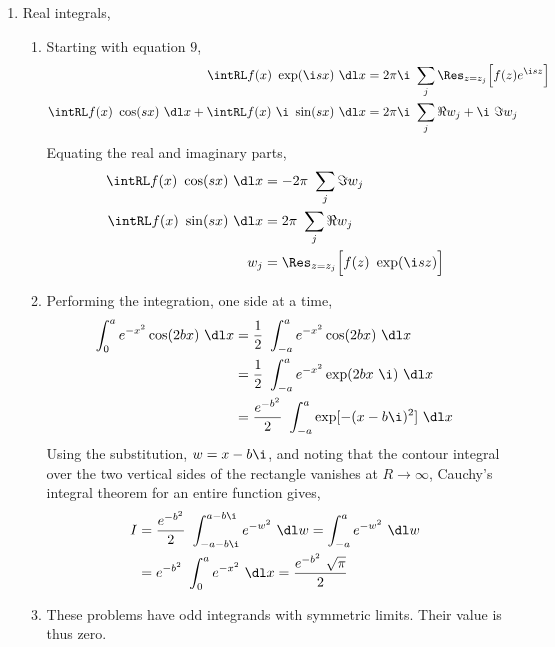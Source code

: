 \begin{enumerate}
    \item Real integrals,
          \begin{enumerate}
              \item Starting with equation $ 9 $,
                    \begin{align}
                        \intRL f(x)\ \exp(\i sx)\ \dl x  & = 2\pi\i
                        \ \sum_j \Res_{z = z_j}
                        \Big[f(z) e^{\i sz} \Big]                   \\
                        \intRL f(x)\ \cos(sx)\ \dl x +
                        \intRL f(x)\ \i\ \sin(sx)\ \dl x & =
                        2\pi\i\ \sum_j \Re{w_j} + \i\ \Im{w_j}
                    \end{align}
                    Equating the real and imaginary parts,
                    \begin{align}
                        \intRL f(x)\ \cos(sx)\ \dl x & = -2\pi\ \sum_j \Im{w_j} \\
                        \intRL f(x)\ \sin(sx)\ \dl x & = 2\pi\ \sum_j \Re{w_j}  \\
                        w_j                          & = \Res_{z = z_j}
                        \Big[ f(z)\ \exp(\i sz) \Big]
                    \end{align}

              \item Performing the integration, one side at a time,
                    \begin{align}
                        \int_{0}^{a} e^{-x^2} \cos(2bx)\ \dl x
                         & = \frac{1}{2}\ \int_{-a}^{a} e^{-x^2} \cos(2bx)\ \dl x     \\
                         & = \frac{1}{2}\ \int_{-a}^{a} e^{-x^2} \exp(2bx\ \i)\ \dl x \\
                         & = \frac{e^{-b^2}}{2}\ \int_{-a}^{a} \exp[-(x - b\i)^2]
                        \ \dl x
                    \end{align}
                    Using the substitution, $ w = x - b\i $, and noting that the contour
                    integral over the two vertical sides of the rectangle vanishes at
                    $ R \to \infty $, Cauchy's integral theorem for an entire function
                    gives,
                    \begin{align}
                        I & = \frac{e^{-b^2}}{2}\ \int_{-a-b\i}^{a-b\i}
                        e^{-w^2}\ \dl w = \int_{-a}^{a} e^{-w^2}\ \dl w \\
                          & = e^{-b^2}\ \int_{0}^{a} e^{-x^2}\ \dl x
                        = \frac{e^{-b^2}\ \sqrt{\pi}}{2}
                    \end{align}

              \item These problems have odd integrands with symmetric limits.
                    Their value is thus zero.

          \end{enumerate}

\end{enumerate}